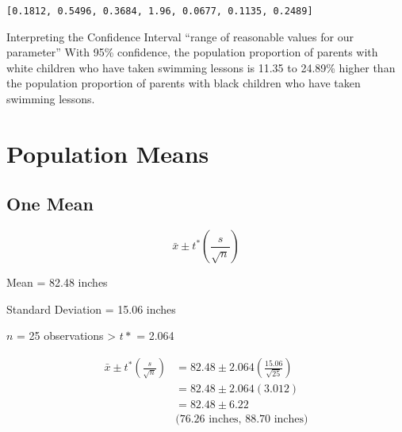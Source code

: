 \documentclass[
  letterpaper,
  DIV=11,
  numbers=noendperiod]{scrartcl}
\begin{document}
\begin{verbatim}
[0.1812, 0.5496, 0.3684, 1.96, 0.0677, 0.1135, 0.2489]
\end{verbatim}

Interpreting the Confidence Interval ``range of reasonable values for
our parameter'' With 95\% confidence, the population proportion of
parents with white children who have taken swimming lessons is 11.35 to
24.89\% higher than the population proportion of parents with black
children who have taken swimming lessons.

\hypertarget{population-means}{%
\section{Population Means}\label{population-means}}

\hypertarget{one-mean}{%
\subsection{One Mean}\label{one-mean}}

\[
\bar{x} \pm t^* \left(\frac{s}{\sqrt{n}}\right)
\]

Mean = 82.48 inches

Standard Deviation = 15.06 inches

\(n\) = 25 observations \textgreater{} \(t*\) = 2.064

\[
\begin{align*}
\bar{x} \pm t^* \left( \frac{s}{\sqrt{n}} \right) &= 82.48 \pm 2.064 \left( \frac{15.06}{\sqrt{25}} \right) \\
&= 82.48 \pm 2.064(3.012) \\
&= 82.48 \pm 6.22 \\
& \text{(76.26 inches, 88.70 inches)} 
\end{align*}
\]
\end{document}
